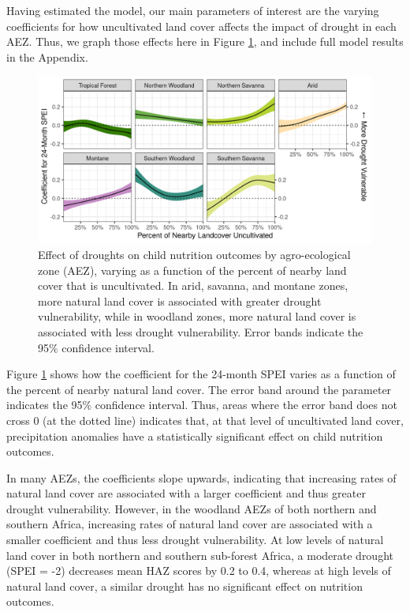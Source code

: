 \documentclass{article}
\begin{document}
Having estimated the model, our main parameters of interest are the varying coefficients for how uncultivated land cover affects the impact of drought in each AEZ.  Thus, we graph those effects here in Figure \ref{fig:naturaleffect}, and include full model results in the Appendix.

\begin{figure}[h!]
	\begin{center}
	\includegraphics[width=\linewidth]{AEZ_effects.png}
	\end{center}
	\caption{Effect of droughts on child nutrition outcomes by agro-ecological zone (AEZ), varying as a function of the percent of nearby land cover that is uncultivated.  In arid, savanna, and montane zones, more natural land cover is associated with greater drought vulnerability, while in woodland zones, more natural land cover is associated with less drought vulnerability.  Error bands indicate the 95\% confidence interval.}
	\label{fig:naturaleffect}
\end{figure}

Figure \ref{fig:naturaleffect} shows how the coefficient for the 24-month SPEI varies as a function of the percent of nearby natural land cover.  The error band around the parameter indicates the 95\% confidence interval.  Thus, areas where the error band does not cross 0 (at the dotted line) indicates that, at that level of uncultivated land cover, precipitation anomalies have a statistically significant effect on child nutrition outcomes.

In many AEZs, the coefficients slope upwards, indicating that increasing rates of natural land cover are associated with a larger coefficient and thus greater drought vulnerability.  However, in the woodland AEZs of both northern and southern Africa, increasing rates of natural land cover are associated with a smaller coefficient and thus less drought vulnerability.  At low levels of natural land cover in both northern and southern sub-forest Africa, a moderate drought (SPEI = -2) decreases mean HAZ scores by 0.2 to 0.4, whereas at high levels of natural land cover, a similar drought has no significant effect on nutrition outcomes.
\end{document}
